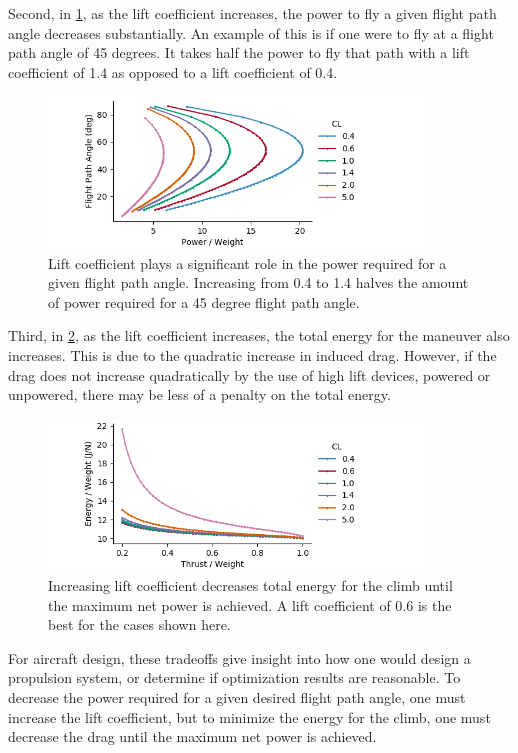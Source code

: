 \documentclass[10pt,english]{article}
\begin{document}
Second, in \cref{f:Power_dist_analytical}, as the lift coefficient increases, the power to fly a given flight path angle decreases substantially.  An example of this is if one were to fly at a flight path angle of 45 degrees.  It takes half the power to fly that path with a lift coefficient of 1.4 as opposed to a lift coefficient of 0.4.

\begin{figure}[H]
\centering
\includegraphics[trim={.0cm 0.0cm .0cm 0cm},clip,width=0.9\textwidth]{flight_angle_power_analytical}
\vspace{-5pt}
\caption{Lift coefficient plays a significant role in the power required for a given flight path angle.  Increasing from 0.4 to 1.4 halves the amount of power required for a 45 degree flight path angle.}
\label{f:Power_dist_analytical}
\end{figure}

Third, in \cref{f:t_compare}, as the lift coefficient increases, the total energy for the maneuver also increases.  This is due to the quadratic increase in induced drag.  However, if the drag does not increase quadratically by the use of high lift devices, powered or unpowered, there may be less of a penalty on the total energy.

\begin{figure}[H]
\centering
\includegraphics[trim={.0cm 0.0cm .0cm 0cm},clip,width=0.9\textwidth]{Energy_TW_analytical}
\vspace{-5pt}
\caption{Increasing lift coefficient decreases total energy for the climb until the maximum net power is achieved.  A lift coefficient of 0.6 is the best for the cases shown here.}
\label{f:t_compare}
\end{figure}

For aircraft design, these tradeoffs give insight into how one would design a propulsion system, or determine if optimization results are reasonable.  To decrease the power required for a given desired flight path angle, one must increase the lift coefficient, but to minimize the energy for the climb, one must decrease the drag until the maximum net power is achieved. 
\end{document}
